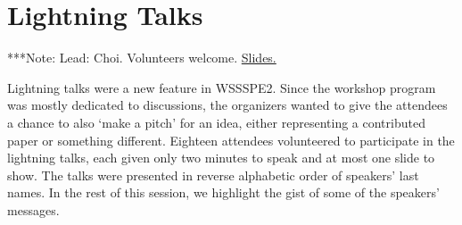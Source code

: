 \documentclass[11pt, oneside]{amsart}
\newcommand{\note}[1]{ {\textcolor{blueish}    { ***Note:      #1 }}}
\begin{document}
\section{Lightning Talks} \label{sec:lightning}

\note{Lead: Choi. Volunteers welcome.
\href{http://wssspe.researchcomputing.org.uk/wssspe2/lightning-talks/}{Slides.}}
 
 
\begin{comment}
Lighting talks, breakout groups, working groups are all different. Lightning
talks were new in WSSSPE2. They were offered to all paper contributors, and some
other attendees, those who got travel awards. Breakout groups in WSSSPE1 were
just discussions about topics; in WSSSPE2, the breakout groups were supposed to
come up with plans for actions in specific areas. The idea of working groups is
that they will come out of breakout groups as a way for the groups to actually
do the actions over time, not at the workshops.
\end{comment{

 
\begin{comment}  
Email addresses of speakers:
gvwilson@software-carpentry.org, Colin Venters <C.Venters@hud.ac.uk>,
j.spencer@imperial.ac.uk, erinrobinson@esipfed.org, marpierc@iu.edu,
jwpeterson@gmail.com, abani@buffalo.edu, clenhardt@renci.org, dsk@uchicago.edu,
Samin.Ishtiaq@microsoft.com, james@howison.name, s.a.harris@leeds.ac.uk,
marcus.hanwell@kitware.com, thabermann@hdfgroup.org, rdowns@ciesin.columbia.edu,
cboettig@gmail.com, jakob.blomer@cern.ch, editor@ascl.net 
\end{comment}  
  
Lightning talks were a new feature in WSSSPE2. Since the workshop program was
mostly dedicated to discussions, the organizers wanted to give the attendees a
chance to also `make a pitch' for an idea, either representing a contributed paper
or something different.  Eighteen attendees volunteered to participate in the lightning
talks, each given only two minutes to speak and at most one slide to show.
The talks were presented in reverse alphabetic order of speakers' last names. 
In the rest of this session, we highlight the gist of some of the speakers' messages.
\end{document}
